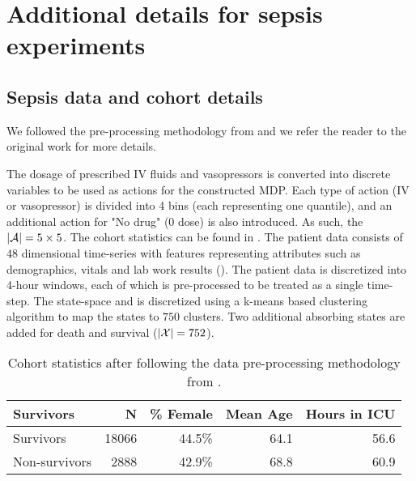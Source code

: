 \section{Additional details for sepsis experiments}
\label{app:sepsis-details}


\subsection{Sepsis data and cohort details}
\label{app:sepsis-dataset}

We followed the pre-processing methodology from \cite{tang2020clinician, komorowski2018artificial} and we refer the reader to the original work for more details. 


The dosage of prescribed IV fluids and vasopressors is converted into discrete variables to be used as actions for the constructed MDP. Each type of action (IV or vasopressor) is divided into 4 bins (each representing one quantile), and an additional action for "No drug" (0 dose) is also introduced. As such, the $|\mathcal{A}| = 5 \times 5$.
The cohort statistics can be found in . The patient data consists of 48 dimensional time-series with features representing attributes such as demographics, vitals and lab work results (). 
The patient data is discretized into 4-hour windows, each of which is pre-processed to be treated as a single time-step. The state-space and is discretized using a k-means based clustering algorithm to map the states to $750$ clusters. Two additional absorbing states are added for death and survival ($|\mathcal{X}|=752$).

\begin{table}[h]
    \centering
    \caption{Cohort statistics after following the data pre-processing methodology from \cite{tang2020clinician, komorowski2018artificial}.}
    \label{table:cohort-stats}
    \vskip 0.1in
    \begin{tabular}{lrrrr}
    \toprule
     Survivors &     N & \% Female & Mean Age & Hours in ICU \\
    \midrule
     Survivors & 18066 &    44.5\% &     64.1 &         56.6 \\
    Non-survivors &  2888 &    42.9\% &     68.8 &         60.9 \\
    \bottomrule
\end{tabular}
\end{table}



